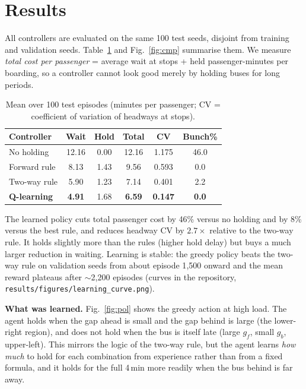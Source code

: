 \documentclass[10pt,twocolumn,a4paper]{article}
\begin{document}
\section{Results}
All controllers are evaluated on the same 100 test seeds, disjoint from training
and validation seeds. Table~\ref{tab:res} and Fig.~\ref{fig:cmp} summarise them.
We measure \emph{total cost per passenger} = average wait at stops + held
passenger-minutes per boarding, so a controller cannot look good merely by holding
buses for long periods.

\begin{table}[h]
\centering\small
\setlength{\tabcolsep}{3.2pt}
\begin{tabular}{lccccc}
\toprule
Controller & Wait & Hold & Total & CV & Bunch\% \\
\midrule
No holding      & 12.16 & 0.00 & 12.16 & 1.175 & 46.0 \\
Forward rule    & 8.13  & 1.43 & 9.56  & 0.593 & 0.0 \\
Two-way rule    & 5.90  & 1.23 & 7.14  & 0.401 & 2.2 \\
\textbf{Q-learning} & \textbf{4.91} & 1.68 & \textbf{6.59} & \textbf{0.147} & \textbf{0.0} \\
\bottomrule
\end{tabular}
\caption{Mean over 100 test episodes (minutes per passenger; CV = coefficient of
variation of headways at stops).}
\label{tab:res}
\end{table}

The learned policy cuts total passenger cost by 46\% versus no holding and by 8\%
versus the best rule, and reduces headway CV by $2.7\times$ relative to the two-way
rule. It holds slightly more than the rules (higher hold delay) but buys a much
larger reduction in waiting. Learning is stable: the greedy policy beats the
two-way rule on validation seeds from about episode 1{,}500 onward and the mean
reward plateaus after $\sim$2{,}200 episodes (curves in the repository,
\texttt{results/figures/learning\_curve.png}).

\textbf{What was learned.} Fig.~\ref{fig:pol} shows the greedy action at high
load. The agent holds when the gap ahead is small and the gap behind is large (the
lower-right region), and does not hold when the bus is itself late (large $g_f$,
small $g_b$, upper-left). This mirrors the logic of the two-way rule, but the agent
learns \emph{how much} to hold for each combination from experience rather than
from a fixed formula, and it holds for the full 4\,min more readily when the bus
behind is far away.
\end{document}
